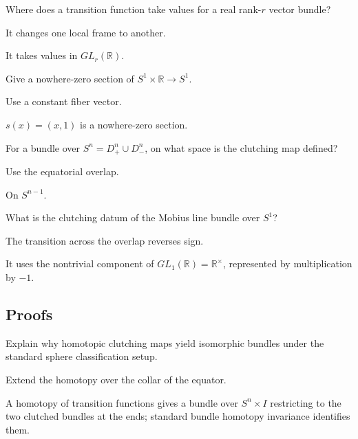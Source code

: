 \begin{exercise}\label{exr:viii30-ped-02}
Where does a transition function take values for a real rank-$r$ vector bundle?
\end{exercise}
\begin{hint}
It changes one local frame to another.
\end{hint}
\begin{solution}
It takes values in $GL_r(\mathbb R)$.
\end{solution}

\begin{exercise}\label{exr:viii30-ped-03}
Give a nowhere-zero section of $S^1\times\mathbb R\to S^1$.
\end{exercise}
\begin{hint}
Use a constant fiber vector.
\end{hint}
\begin{solution}
$s(x)=(x,1)$ is a nowhere-zero section.
\end{solution}

\begin{exercise}\label{exr:viii30-ped-04}
For a bundle over $S^n=D^n_+\cup D^n_-$, on what space is the clutching map defined?
\end{exercise}
\begin{hint}
Use the equatorial overlap.
\end{hint}
\begin{solution}
On $S^{n-1}$.
\end{solution}

\begin{exercise}\label{exr:viii30-ped-05}
What is the clutching datum of the Mobius line bundle over $S^1$?
\end{exercise}
\begin{hint}
The transition across the overlap reverses sign.
\end{hint}
\begin{solution}
It uses the nontrivial component of $GL_1(\mathbb R)=\mathbb R^\times$, represented by multiplication by $-1$.
\end{solution}

\subsection*{Proofs}

\begin{exercise}\label{exr:viii30-ped-06}
Explain why homotopic clutching maps yield isomorphic bundles under the standard sphere classification setup.
\end{exercise}
\begin{hint}
Extend the homotopy over the collar of the equator.
\end{hint}
\begin{solution}
A homotopy of transition functions gives a bundle over $S^n\times I$ restricting to the two clutched bundles at the ends; standard bundle homotopy invariance identifies them.
\end{solution}

